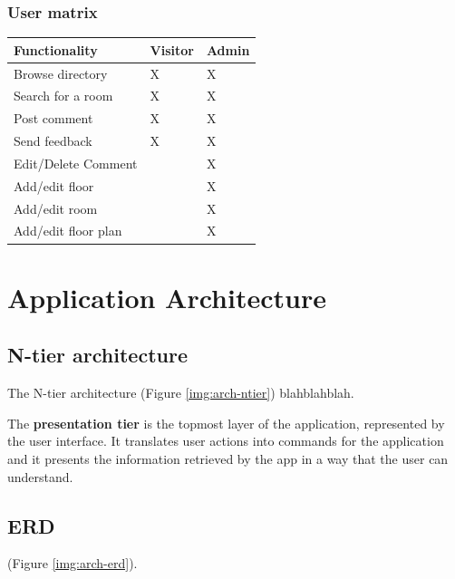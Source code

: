 \documentclass{sig-alt-release2}
\begin{document}
\subsubsection*{User matrix}
\begin{tabular}{| p{4cm} | p{1cm} | p{1cm}|} \hline
\textbf{Functionality} & \textbf{Visitor} & \textbf{Admin} \\ \hline
Browse directory & X & X \\ \hline
Search for a room & X & X \\ \hline
Post comment & X & X \\ \hline
Send feedback & X & X \\ \hline
Edit/Delete Comment & & X \\ \hline
Add/edit floor &  & X \\ \hline
Add/edit room & & X \\ \hline
Add/edit floor plan & & X \\ \hline

\end{tabular}	


\section{Application Architecture}

\subsection*{N-tier architecture}
The N-tier architecture (Figure \ref{img:arch-ntier}) blahblahblah.

The \textbf{presentation tier} is the topmost layer of the application,
represented by the user interface. It translates user actions into commands
for the application and it presents the information retrieved by the app in a
way that the user can understand.



\subsection*{ERD}

 (Figure \ref{img:arch-erd}).



\end{document}
